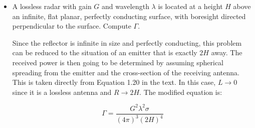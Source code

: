 \documentclass[letterpaper,10pt]{article}\usepackage[]{graphicx}\usepackage[]{color}
\newcommand{\question}[3]{
\begin{itemize}
\item[{\makebox[1cm]{#1)}}] #2

\vspace{.2in}

#3

\end{itemize}

\vspace{.2in}
}
\begin{document}
\question{1.6}{A lossless radar with gain $G$ and wavelength $\lambda$ is located at a height $H$ above an infinite, flat planar, perfectly conducting surface, with boresight directed perpendicular to the surface. Compute $\Gamma$.}
{

Since the reflector is infinite in size and perfectly conducting, this problem can be reduced to the situation of an emitter that is exactly $2H$ away.  The received power is then going to be determined by assuming spherical spreading from the emitter and the cross-section of the receiving antenna.  This is taken directly from Equation 1.20 in the text.  In this case, $L\rightarrow 0$ since it is a lossless antenna and $R\rightarrow 2H$.  The modified equation is:

\begin{equation*}
\Gamma = \frac{G^2\lambda^2\sigma}{(4\pi)^3(2H)^4}
\end{equation*}

}
\end{document}
